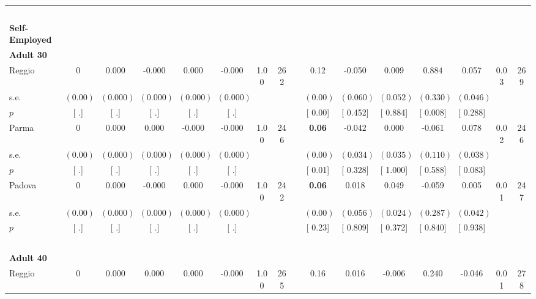 \begin{longtable}{L{8em} c c c c c c c p{1em} c c c c c c c}
~\\[1em]
\textbf{Self-Employed} \\*
\quad \quad \textbf{Adult 30} & & & & & & & & & & & & & & & \\* 
\quad \quad \quad Reggio& 0 &     0.000 &    -0.000 &     0.000 &    -0.000 &      1.00 &       262 & & 0.12 &    -0.050 &     0.009 & $ \mathbf{    0.884}$ &     0.057 &      0.03 &       269  \\*
\quad \quad \quad \quad s.e.& $ (     0.00)$ & $ (    0.000)$ & $ (    0.000)$ & $ (    0.000)$ & $ (    0.000)$ & & & & $ (     0.00)$ & $ (    0.060)$ & $ (    0.052)$ & $ (    0.330)$ & $ (    0.046)$ & &  \\*
\quad \quad \quad \quad $ p$ & [        .] & [        .] & [        .] & [        .] & [        .] & & & & [     0.00] & [    0.452] & [    0.884] & [    0.008] & [    0.288] & &  \\[1em]
\quad \quad \quad Parma& 0 &     0.000 &     0.000 &    -0.000 &    -0.000 &      1.00 &       246 & & \textbf{     0.06} &    -0.042 &     0.000 &    -0.061 & $ \mathbf{    0.078}$ &      0.02 &       246  \\*
\quad \quad \quad \quad s.e.& $ (     0.00)$ & $ (    0.000)$ & $ (    0.000)$ & $ (    0.000)$ & $ (    0.000)$ & & & & $ (     0.00)$ & $ (    0.034)$ & $ (    0.035)$ & $ (    0.110)$ & $ (    0.038)$ & &  \\*
\quad \quad \quad \quad $ p$ & [        .] & [        .] & [        .] & [        .] & [        .] & & & & [     0.01] & [    0.328] & [    1.000] & [    0.588] & [    0.083] & &  \\[1em]
\quad \quad \quad Padova& 0 &     0.000 &    -0.000 &     0.000 &    -0.000 &      1.00 &       242 & & \textbf{     0.06} &     0.018 &     0.049 &    -0.059 &     0.005 &      0.01 &       247  \\*
\quad \quad \quad \quad s.e.& $ (     0.00)$ & $ (    0.000)$ & $ (    0.000)$ & $ (    0.000)$ & $ (    0.000)$ & & & & $ (     0.00)$ & $ (    0.056)$ & $ (    0.024)$ & $ (    0.287)$ & $ (    0.042)$ & &  \\*
\quad \quad \quad \quad $ p$ & [        .] & [        .] & [        .] & [        .] & [        .] & & & & [     0.23] & [    0.809] & [    0.372] & [    0.840] & [    0.938] & &  \\[1em]
~\\[1em]
\quad \quad \textbf{Adult 40} & & & & & & & & & & & & & & & \\* 
\quad \quad \quad Reggio& 0 &     0.000 &     0.000 &     0.000 &    -0.000 &      1.00 &       265 & & 0.16 &     0.016 &    -0.006 &     0.240 &    -0.046 &      0.01 &       278  \\*

\end{longtable}
